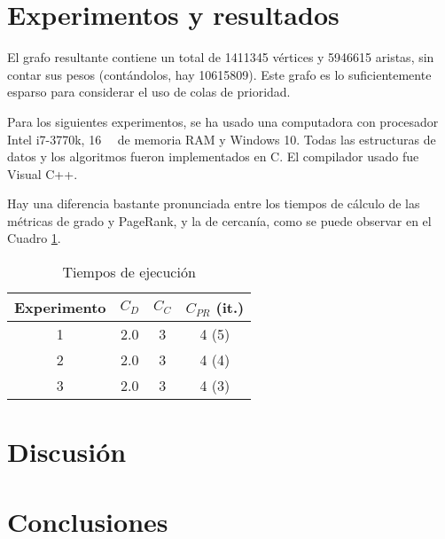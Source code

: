 \documentclass[journal]{IEEEtran}
\let\MYoriglatexcaption\caption
\renewcommand{\caption}[2][\relax]{\MYoriglatexcaption[#2]{#2}}
\begin{document}
\section{Experimentos y resultados}
El grafo resultante contiene un total de \num{1411345} vértices y \num{5946615} aristas, sin contar sus pesos (contándolos, hay \num{10615809}). Este grafo es lo suficientemente esparso para considerar el uso de colas de prioridad.

Para los siguientes experimentos, se ha usado una computadora con procesador Intel i7-3770k, \SI{16}{\giga\byte} de memoria RAM y Windows 10. Todas las estructuras de datos y los algoritmos fueron implementados en C. El compilador usado fue Visual C++.

Hay una diferencia bastante pronunciada entre los tiempos de cálculo de las métricas de grado y PageRank, y la de cercanía, como se puede observar en el Cuadro \ref{tejecucion}.

\begin{table}
	\renewcommand{\arraystretch}{1.3}
	\caption{Tiempos de ejecución}
	\label{tejecucion}
	\centering
	\begin{tabular}{c|c|c|c}
		\hline
		Experimento & \(C_D\) & \(C_C\) & \(C_{PR}\) (it.) \\
		\hline\hline
		1 & 2.0 & 3 & 4 (5) \\
		2 & 2.0 & 3 & 4 (4) \\
		3 & 2.0 & 3 & 4 (3) \\
		\hline
	\end{tabular}
\end{table}


\section{Discusión}

\section{Conclusiones}

\ifCLASSOPTIONcaptionsoff
  \newpage
\fi

\end{document}
